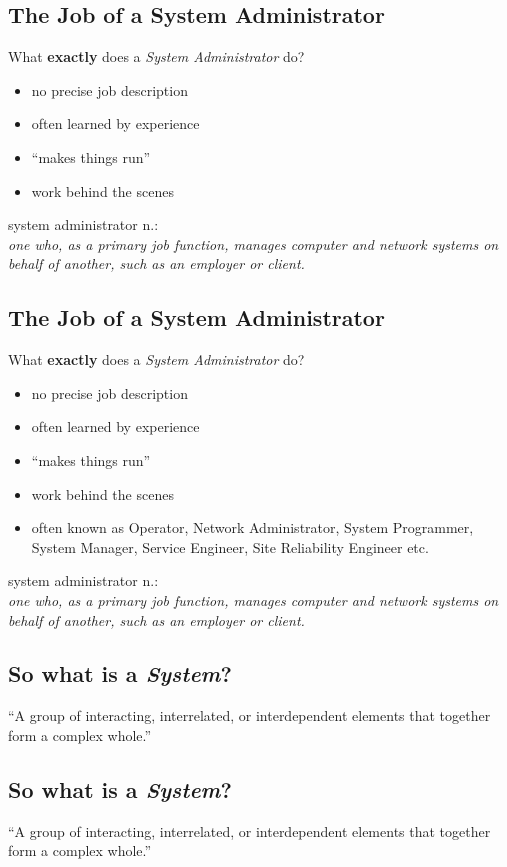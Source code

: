 \documentclass[xga]{xdvislides}
\begin{document}
\subsection{The Job of a System Administrator}
What {\bf exactly} does a {\em System Administrator} do?
\begin{itemize}
	\item no precise job description
	\item often learned by experience
	\item ``makes things run''
	\item work behind the scenes
\end{itemize}
\vfill
system administrator n.: \\
{\em one who, as a primary job function,
	manages computer and network systems on behalf of another, such as an
	employer or client.}

\subsection{The Job of a System Administrator}
What {\bf exactly} does a {\em System Administrator} do?
\begin{itemize}
	\item no precise job description
	\item often learned by experience
	\item ``makes things run''
	\item work behind the scenes
	\item often known as Operator, Network Administrator, System Programmer, System
		Manager, Service Engineer, Site Reliability Engineer etc.
\end{itemize}
\vfill
system administrator n.: \\
{\em one who, as a primary job function,
	manages computer and network systems on behalf of another, such as an
	employer or client.}

\subsection{So what is a {\em System}?}
``A group of interacting, interrelated, or interdependent elements that
together form a complex whole.''


\subsection{So what is a {\em System}?}
``A group of interacting, interrelated, or interdependent elements that
together form a complex whole.''
\\
\end{document}
